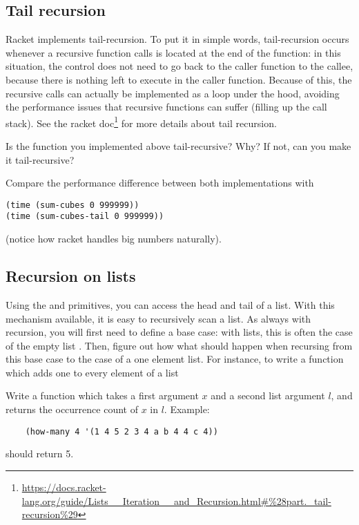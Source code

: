 \documentclass{../../../tp}
\begin{document}
\subsection{Tail recursion}

Racket implements tail-recursion. To put it in simple words, tail-recursion occurs whenever a recursive function calls is located at the end of the function: in this situation, the control does not need to go back to the caller function to the callee, because there is nothing left to execute in the caller function. Because of this, the recursive calls can actually be implemented as a loop under the hood, avoiding the performance issues that recursive functions can suffer (filling up the call stack). See the racket doc\footnote{\url{https://docs.racket-lang.org/guide/Lists\_\_Iteration\_\_and\_Recursion.html\#\%28part._tail-recursion\%29}} for more details about tail recursion.

\begin{instruction}
Is the  function you implemented above tail-recursive? Why? If not, can you make it tail-recursive?

Compare the performance difference between both implementations with

\begin{verbatim}
(time (sum-cubes 0 999999))
(time (sum-cubes-tail 0 999999))
\end{verbatim}

(notice how racket handles big numbers naturally).
\end{instruction}


\subsection{Recursion on lists}

Using the \car and \cdr primitives, you can access the head and tail of a list. With this mechanism available, it is easy to recursively scan a list. As always with recursion, you will first need to define a base case: with lists, this is often the case of the empty list . Then, figure out how what should happen when recursing from this base case to the case of a one element list. For instance, to write a function which adds one to every element of a list 

\begin{instruction}	
	Write a function  which takes a first argument $x$ and a second list argument $l$, and returns the occurrence count of $x$ in $l$. Example:
	
	\begin{verbatim}
	(how-many 4 '(1 4 5 2 3 4 a b 4 4 c 4))
	\end{verbatim}
	
	should return 5.
\end{instruction}
\end{document}
